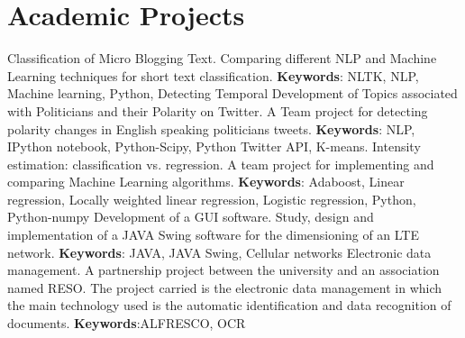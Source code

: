 \documentclass[11pt,a4paper,sans]{moderncv}        %
\begin{document}
	
	\section{Academic Projects} %
		\label{sec:academic_projects}

				{Classification of Micro Blogging Text. 
				\newline{}
				Comparing different NLP and Machine Learning techniques for short text classification.
				\newline{}
				\textbf{Keywords}: NLTK, NLP, Machine learning, Python,  
				}		
				{Detecting Temporal Development of Topics associated with Politicians and their Polarity on Twitter. 
				\newline{}
				A Team project for detecting polarity changes in English speaking politicians tweets.
				\newline{}
				\textbf{Keywords}: NLP, IPython notebook, Python-Scipy, Python Twitter API, K-means.
				}		
				{Intensity estimation: classification vs. regression. 
				\newline{}
				A team project for implementing and comparing Machine Learning algorithms.
				\newline{}
				\textbf{Keywords}: Adaboost, Linear regression, Locally weighted linear regression, Logistic regression, Python, Python-numpy
				}
				{Development of a GUI software. 
				\newline{}
				Study, design and implementation of a JAVA Swing software for the dimensioning of an LTE network.
				\newline{}
				\textbf{Keywords}: JAVA, JAVA Swing, Cellular networks
				}
				{Electronic data management.  
				\newline{}
				A partnership project between the university and an association named RESO. The project carried is the electronic data management in which the main technology used is the automatic identification and data recognition of documents.			
				\newline{}
				\textbf{Keywords}:ALFRESCO, OCR
				}
	
\end{document}
